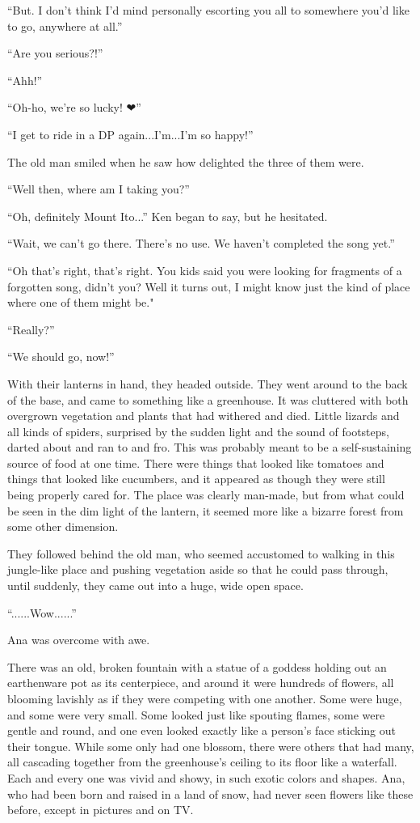 \documentclass[
]{article}
\begin{document}
``But. I don't think I'd mind personally escorting you all to somewhere
you'd like to go, anywhere at all.''

``Are you serious?!''

``Ahh!''

``Oh-ho, we're so lucky! ❤''

``I get to ride in a DP again...I'm...I'm so happy!''

The old man smiled when he saw how delighted the three of them were.

``Well then, where am I taking you?''

``Oh, definitely Mount Ito...'' Ken began to say, but he hesitated.

``Wait, we can't go there. There's no use. We haven't completed the song
yet.''

``Oh that's right, that's right. You kids said you were looking for
fragments of a forgotten song, didn't you? Well it turns out, I might
know just the kind of place where one of them might be."

``Really?''

``We should go, now!''

With their lanterns in hand, they headed outside. They went around to
the back of the base, and came to something like a greenhouse. It was
cluttered with both overgrown vegetation and plants that had withered
and died. Little lizards and all kinds of spiders, surprised by the
sudden light and the sound of footsteps, darted about and ran to and
fro. This was probably meant to be a self-sustaining source of food at
one time. There were things that looked like tomatoes and things that
looked like cucumbers, and it appeared as though they were still being
properly cared for. The place was clearly man-made, but from what could
be seen in the dim light of the lantern, it seemed more like a bizarre
forest from some other dimension.

They followed behind the old man, who seemed accustomed to walking in
this jungle-like place and pushing vegetation aside so that he could
pass through, until suddenly, they came out into a huge, wide open
space.

``......Wow......''

Ana was overcome with awe.

There was an old, broken fountain with a statue of a goddess holding out
an earthenware pot as its centerpiece, and around it were hundreds of
flowers, all blooming lavishly as if they were competing with one
another. Some were huge, and some were very small. Some looked just like
spouting flames, some were gentle and round, and one even looked exactly
like a person's face sticking out their tongue. While some only had one
blossom, there were others that had many, all cascading together from
the greenhouse's ceiling to its floor like a waterfall. Each and every
one was vivid and showy, in such exotic colors and shapes. Ana, who had
been born and raised in a land of snow, had never seen flowers like
these before, except in pictures and on TV.
\end{document}
